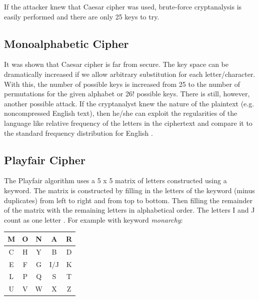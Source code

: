 \documentclass{article}
\begin{document}
If the attacker knew that Caesar cipher was used, brute-force cryptanalysis is easily performed and there are only 25 keys to try.

\subsection{Monoalphabetic Cipher}
It was shown that Caesar cipher is far from secure. The key space can be dramatically increased if we allow arbitrary substitution for each letter/character. With this, the number of possible keys is increased from 25 to the number of permutations for the given alphabet or 26! possible keys. There is still, however, another possible attack. If the cryptanalyst knew the nature of the plaintext (e.g. noncompressed English text), then he/she can exploit the regularities of the language like relative frequency of the letters in the ciphertext and compare it to the standard frequency distribution for English \cite{stallings2011}.

\subsection{Playfair Cipher}
The Playfair algorithm uses a 5 x 5 matrix of letters constructed using a keyword. The matrix is constructed by filling in the letters of the keyword (minus duplicates) from left to right and from top to bottom. Then filling the remainder of the matrix with the remaining letters in alphabetical order. The letters I and J count as one letter \cite{stallings2011}. For example with keyword \textit{monarchy}:
\\

\begin{tabular}{|c|c|c|c|c|}
\hline
M & O & N & A & R\\
\hline
C & H & Y & B & D\\
\hline
E & F & G & I/J & K\\
\hline
L & P & Q & S & T\\
\hline
U & V & W & X & Z\\
\hline
\end{tabular}
\\
\end{document}
